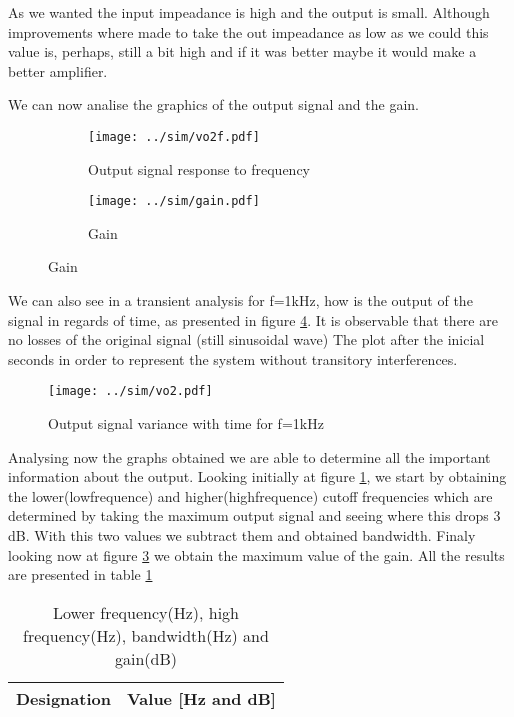 As we wanted the input impeadance is high and the output is small. Although improvements where made to take the out impeadance as low as we could this value is, perhaps, still a bit high and if it was better maybe it would make a better amplifier. \par
We can now analise the graphics of the output signal and the gain.

\begin{figure}[H]
  \begin{subfigure}{.49\linewidth}
    \centering
    \texttt{[image: ../sim/vo2f.pdf]}
    \footnotesize
  \caption{Output signal response to frequency}
   \label{fig:out1}
  \end{subfigure}
  \hspace{5mm}
  \begin{subfigure}{.49\linewidth}
    \centering
  \texttt{[image: ../sim/gain.pdf]}
  \caption{Gain}
  \label{fig:out2}
  \end{subfigure}
\end{figure}

We can also see in a transient analysis for f=1kHz, how is the output of the signal in regards of time, as presented in figure \ref{fig:outtime}. It is observable that there are no losses of the original signal (still sinusoidal wave)  The plot after the inicial seconds in order to represent the system without transitory interferences.
 \begin{figure}[H]
    \centering
  \texttt{[image: ../sim/vo2.pdf]}
  \caption{Output signal variance with time for f=1kHz}
  \label{fig:outtime}
\end{figure}

 

Analysing now the graphs obtained we are able to determine all the important information about the output. Looking initially at figure \ref{fig:out1}, we start by obtaining the lower(lowfrequence) and higher(highfrequence) cutoff frequencies which are determined by taking the maximum output signal and seeing where this drops 3 dB. With this two values we subtract them and obtained bandwidth. Finaly looking now at figure \ref{fig:out2} we obtain the maximum value of the gain. All the results are presented in table \ref{tab:rip}
\begin{table}[H]
  \centering
  \begin{tabular}{|c|c|}
    \hline
        {\bf Designation} & {\bf Value [Hz and dB]} \\ \hline
        
  \end{tabular}
  \caption{Lower frequency(Hz), high frequency(Hz), bandwidth(Hz) and gain(dB)} 
  \label{tab:rip}
\end{table}



